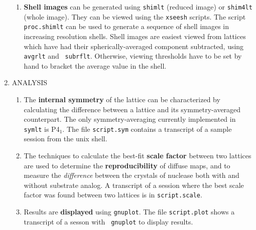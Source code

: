 \begin{enumerate}
\begin{enumerate}
\item {\bf Shell images} can be generated using {\tt shimlt} (reduced
image) or {\tt shim4lt} (whole image).  They can be viewed using the
{\tt xseesh} scripts.  The script {\tt proc.shimlt} can be used to
generate a sequence of shell images in increasing resolution shells.
Shell images are easiest viewed from lattices which have had their
spherically-averaged component subtracted, using {\tt avgrlt} and {\tt
subrflt}.  Otherwise, viewing thresholds have to be set by hand to
bracket the average value in the shell.
\end{enumerate}
\item ANALYSIS
\begin{enumerate}
\item The {\bf internal symmetry} of the lattice can be characterized by
calculating the difference between a lattice and its symmetry-averaged
counterpart.  The only symmetry-averaging currently implemented in
{\tt symlt} is P4$_1$.  The file {\tt script.sym} contains a
transcript of a sample session from the unix shell.

\item The techniques to
calculate the best-fit {\bf scale factor} between two lattices are
used to determine the {\bf reproducibility} of diffuse maps, and to measure
the {\it difference} between the crystals of nuclease both with and without
substrate analog.  A transcript of a session where the best scale
factor was found between two lattices is in {\tt script.scale}.  

\item Results are {\bf displayed} using {\tt gnuplot}.  The 
file {\tt script.plot} shows a transcript of a sesson with {\tt
gnuplot} to display results.
\end{enumerate}
\end{enumerate}


